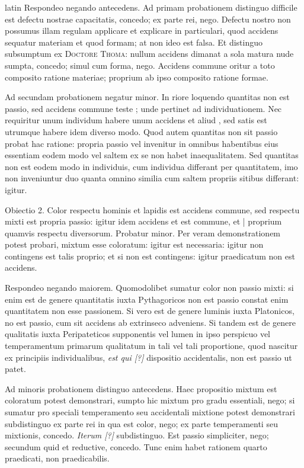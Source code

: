 \begin{otherlanguage*}{latin}
\pstart
  Respondeo negando antecedens. Ad primam probationem distinguo difficile est defectu nostrae capacitatis, concedo; ex parte rei, nego. Defectu nostro non possumus illam regulam applicare et explicare in particulari, quod accidens sequatur materiam et quod formam; at non ideo est falsa. Et distinguo subsumptum ex \textsc{Doctore Thoma}: nullum accidens dimanat a sola matura nude sumpta, concedo; simul cum forma, nego. Accidens commune oritur a toto composito ratione materiae; proprium ab ipso composito ratione formae. 
\pend

\pstart
  Ad secundam probationem negatur minor. In riore loquendo quantitas non est passio, sed accidens commune teste ; unde pertinet ad individuationem. Nec requiritur unum individum habere unum accidens et aliud , sed satis est utrumque habere idem diverso modo. Quod autem quantitas non sit passio probat hac ratione: propria passio vel invenitur in omnibus habentibus eius essentiam eodem modo vel saltem ex se non habet inaequalitatem. Sed quantitas non est eodem modo in individuis, cum individua differant per quantitatem, imo non inveniuntur duo quanta omnino similia cum saltem propriis sitibus differant: igitur. 
\pend

\pstart
  Obiectio 2. Color respectu hominis et lapidis est accidens commune, sed respectu mixti est propria passio: igitur idem accidens et est commune, et \textnormal{|} proprium quamvis respectu diversorum. Probatur minor. Per veram demonstrationem potest probari, mixtum esse coloratum: igitur est necessaria: igitur non contingens est talis proprio; et si non est contingens: igitur praedicatum non est accidens. 
\pend

\pstart
  Respondeo negando maiorem. Quomodolibet sumatur color non passio mixti: si enim est de genere quantitatis iuxta Pythagoricos non est passio constat enim quantitatem non esse passionem. Si vero est de genere luminis iuxta Platonicos, no est passio, cum sit accidens ab extrinseco adveniens. Si tandem est de genere qualitatis iuxta Peripateticos supponentis vel lumen in ipso perspicuo vel temperamentum primarum qualitatum in tali vel tali proportione, quod nascitur ex principiis individualibus, \emph{est qui [?]} dispositio accidentalis, non est passio ut patet. 
\pend

\pstart
  Ad minoris probationem distinguo antecedens. Haec propositio mixtum est coloratum potest demonstrari, sumpto hic mixtum pro gradu essentiali, nego; si sumatur pro speciali temperamento seu accidentali mixtione potest demonstrari subdistinguo ex parte rei in qua est color, nego; ex parte temperamenti seu mixtionis, concedo. \emph{Iterum [?]} subdistinguo. Est passio simpliciter, nego; secundum quid et reductive, concedo. Tunc enim habet rationem quarto praedicati, non praedicabilis. 
\pend


\end{otherlanguage*}
